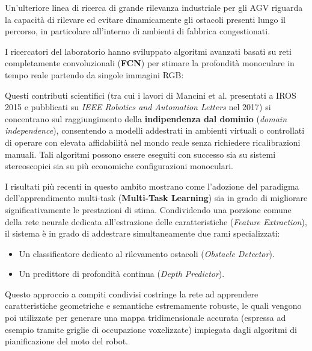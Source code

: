 ﻿\documentclass[11pt, a4paper]{article}
\begin{document}
Un'ulteriore linea di ricerca di grande rilevanza industriale per gli AGV riguarda la capacità di rilevare ed evitare dinamicamente gli ostacoli presenti lungo il percorso, in particolare all'interno di ambienti di fabbrica congestionati.

I ricercatori del laboratorio hanno sviluppato algoritmi avanzati basati su reti completamente convoluzionali (\textbf{FCN}) per stimare la profondità monoculare in tempo reale partendo da singole immagini RGB:


Questi contributi scientifici (tra cui i lavori di Mancini et al. presentati a IROS 2015 e pubblicati su \emph{IEEE Robotics and Automation Letters} nel 2017) si concentrano sul raggiungimento della \textbf{indipendenza dal dominio} (\emph{domain independence}), consentendo a modelli addestrati in ambienti virtuali o controllati di operare con elevata affidabilità nel mondo reale senza richiedere ricalibrazioni manuali. Tali algoritmi possono essere eseguiti con successo sia su sistemi stereoscopici sia su più economiche configurazioni monoculari.


I risultati più recenti in questo ambito mostrano come l'adozione del paradigma dell'apprendimento multi-task (\textbf{Multi-Task Learning}) sia in grado di migliorare significativamente le prestazioni di stima. Condividendo una porzione comune della rete neurale dedicata all'estrazione delle caratteristiche (\emph{Feature Extraction}), il sistema è in grado di addestrare simultaneamente due rami specializzati:
\begin{itemize}[noitemsep]
    \item Un classificatore dedicato al rilevamento ostacoli (\emph{Obstacle Detector}).
    \item Un predittore di profondità continua (\emph{Depth Predictor}).
\end{itemize}

Questo approccio a compiti condivisi costringe la rete ad apprendere caratteristiche geometriche e semantiche estremamente robuste, le quali vengono poi utilizzate per generare una mappa tridimensionale accurata (espressa ad esempio tramite griglie di occupazione voxelizzate) impiegata dagli algoritmi di pianificazione del moto del robot.
\end{document}
